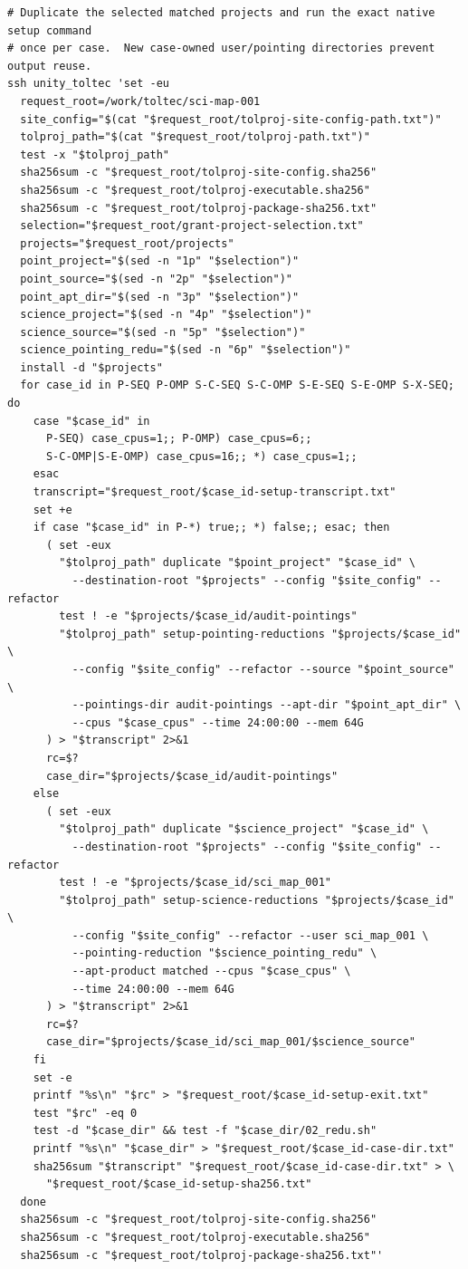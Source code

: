\documentclass[11pt]{article}
\begin{document}
\begin{small}
\begin{verbatim}
# Duplicate the selected matched projects and run the exact native setup command
# once per case.  New case-owned user/pointing directories prevent output reuse.
ssh unity_toltec 'set -eu
  request_root=/work/toltec/sci-map-001
  site_config="$(cat "$request_root/tolproj-site-config-path.txt")"
  tolproj_path="$(cat "$request_root/tolproj-path.txt")"
  test -x "$tolproj_path"
  sha256sum -c "$request_root/tolproj-site-config.sha256"
  sha256sum -c "$request_root/tolproj-executable.sha256"
  sha256sum -c "$request_root/tolproj-package-sha256.txt"
  selection="$request_root/grant-project-selection.txt"
  projects="$request_root/projects"
  point_project="$(sed -n "1p" "$selection")"
  point_source="$(sed -n "2p" "$selection")"
  point_apt_dir="$(sed -n "3p" "$selection")"
  science_project="$(sed -n "4p" "$selection")"
  science_source="$(sed -n "5p" "$selection")"
  science_pointing_redu="$(sed -n "6p" "$selection")"
  install -d "$projects"
  for case_id in P-SEQ P-OMP S-C-SEQ S-C-OMP S-E-SEQ S-E-OMP S-X-SEQ; do
    case "$case_id" in
      P-SEQ) case_cpus=1;; P-OMP) case_cpus=6;;
      S-C-OMP|S-E-OMP) case_cpus=16;; *) case_cpus=1;;
    esac
    transcript="$request_root/$case_id-setup-transcript.txt"
    set +e
    if case "$case_id" in P-*) true;; *) false;; esac; then
      ( set -eux
        "$tolproj_path" duplicate "$point_project" "$case_id" \
          --destination-root "$projects" --config "$site_config" --refactor
        test ! -e "$projects/$case_id/audit-pointings"
        "$tolproj_path" setup-pointing-reductions "$projects/$case_id" \
          --config "$site_config" --refactor --source "$point_source" \
          --pointings-dir audit-pointings --apt-dir "$point_apt_dir" \
          --cpus "$case_cpus" --time 24:00:00 --mem 64G
      ) > "$transcript" 2>&1
      rc=$?
      case_dir="$projects/$case_id/audit-pointings"
    else
      ( set -eux
        "$tolproj_path" duplicate "$science_project" "$case_id" \
          --destination-root "$projects" --config "$site_config" --refactor
        test ! -e "$projects/$case_id/sci_map_001"
        "$tolproj_path" setup-science-reductions "$projects/$case_id" \
          --config "$site_config" --refactor --user sci_map_001 \
          --pointing-reduction "$science_pointing_redu" \
          --apt-product matched --cpus "$case_cpus" \
          --time 24:00:00 --mem 64G
      ) > "$transcript" 2>&1
      rc=$?
      case_dir="$projects/$case_id/sci_map_001/$science_source"
    fi
    set -e
    printf "%s\n" "$rc" > "$request_root/$case_id-setup-exit.txt"
    test "$rc" -eq 0
    test -d "$case_dir" && test -f "$case_dir/02_redu.sh"
    printf "%s\n" "$case_dir" > "$request_root/$case_id-case-dir.txt"
    sha256sum "$transcript" "$request_root/$case_id-case-dir.txt" > \
      "$request_root/$case_id-setup-sha256.txt"
  done
  sha256sum -c "$request_root/tolproj-site-config.sha256"
  sha256sum -c "$request_root/tolproj-executable.sha256"
  sha256sum -c "$request_root/tolproj-package-sha256.txt"'


\end{verbatim}
\end{small}
\end{document}
